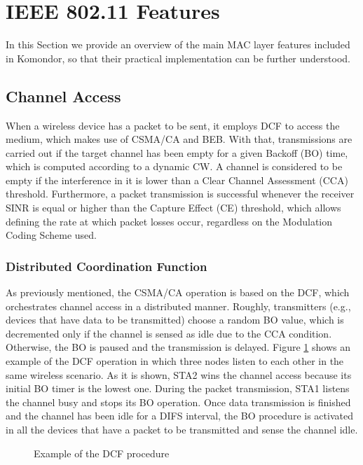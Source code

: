 \documentclass[a4paper]{article}
\begin{document}
\section{IEEE 802.11 Features}
\label{section:mac_features}
In this Section we provide an overview of the main MAC layer features included in Komondor, so that their practical implementation can be further understood.
	
	\subsection{Channel Access}
	\label{section:channel_access}
	When a wireless device has a packet to be sent, it employs DCF to access the medium, which makes use of CSMA/CA and BEB. With that, transmissions are carried out if the target channel has been empty for a given Backoff (BO) time, which is computed according to a dynamic CW. A channel is considered to be empty if the interference in it is lower than a Clear Channel Assessment (CCA) threshold. Furthermore, a packet transmission is successful whenever the receiver SINR is equal or higher than the Capture Effect (CE) threshold, which allows defining the rate at which packet losses occur, regardless on the Modulation Coding Scheme used.
		
		\subsubsection{Distributed Coordination Function}
		\label{section:dcf}		
		As previously mentioned, the CSMA/CA operation is based on the DCF, which orchestrates channel access in a distributed manner. Roughly, transmitters (e.g., devices that have data to be transmitted) choose a random BO value, which is decremented only if the channel is sensed as idle due to the CCA condition. Otherwise, the BO is paused and the transmission is delayed. Figure \ref{fig:dcf_operation} shows an example of the DCF operation in which three nodes listen to each other in the same wireless scenario. As it is shown, STA2 wins the channel access because its initial BO timer is the lowest one. During the packet transmission, STA1 listens the channel busy and stops its BO operation. Once data transmission is finished and the channel has been idle for a DIFS interval, the BO procedure is activated in all the devices that have a packet to be transmitted and sense the channel idle.
		\begin{figure}[h!]
			\centering
			\caption{Example of the DCF procedure}
			\label{fig:dcf_operation}
		\end{figure}
		
\end{document}
